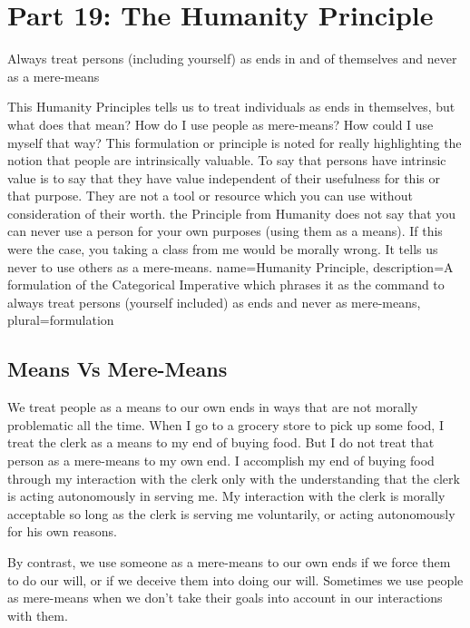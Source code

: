 \chapter{Part 19: The Humanity Principle}
\begin{center}
Always treat persons (including yourself) as ends in and of themselves and never as a mere-means
\end{center}
This \glspl{Humanity Principle} tells us to treat individuals as ends in themselves, but what does that mean? How do I use people as mere-means? How could I use myself that way? This formulation or principle is noted for really highlighting the notion that people are intrinsically valuable. To say that persons have intrinsic value is to say that they have value independent of their usefulness for this or that purpose.  They are not a tool or resource which you can use without consideration of their worth. the Principle from Humanity does not say that you can never use a person for your own purposes (using them as a means). If this were the case, you taking a class from me would be morally wrong. It tells us never to use others as a mere-means.
{
  name=Humanity Principle,
  description={A formulation of the Categorical Imperative which phrases it as the command to always treat persons (yourself included) as ends and never as mere-means},
  plural=formulation
}


\section{Means Vs Mere-Means}

We treat people as a means to our own ends in ways that are not morally problematic all the time. When I go to a grocery store to pick up some food, I treat the clerk as a means to my end of buying food. But I do not treat that person as a mere-means to my own end. I accomplish my end of buying food through my interaction with the clerk only with the understanding that the clerk is acting autonomously in serving me. My interaction with the clerk is morally acceptable so long as the clerk is serving me voluntarily, or acting autonomously for his own reasons.

By contrast, we use someone as a mere-means to our own ends if we force them to do our will, or if we deceive them into doing our will. Sometimes we use people as mere-means when we don't take their goals into account in our interactions with them.



